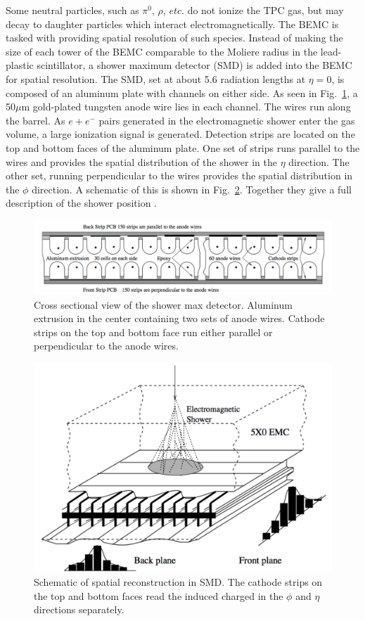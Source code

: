 \documentclass[letterpaper, abstract = on,listof=totoc, bibliography=totoc]{scrreprt}
\begin{document}
Some neutral particles, such as $\pi^0$, $\rho$, $etc.$ do not ionize the TPC gas, but may decay to daughter particles which interact electromagnetically. The BEMC is tasked with providing spatial resolution of such species. Instead of making the size of each tower of the BEMC comparable to the Moliere radius in the lead-plastic scintillator, a shower maximum detector (SMD) is added into the BEMC for spatial resolution. The SMD, set at about 5.6 radiation lengths at $\eta=0$, is composed of an aluminum plate with channels on either side. As seen in Fig.~\ref{fig:SMD2}, a 50$\mu$m gold-plated tungsten anode wire lies in each channel. The wires run along the barrel. As $e+e^-$ pairs generated in the electromagnetic shower enter the gas volume, a large ionization signal is generated. Detection strips are located on the top and bottom faces of the aluminum plate. One set of strips runs parallel to the wires and provides the spatial distribution of the shower in the $\eta$ direction. The other set, running perpendicular to the wires provides the spatial distribution in the $\phi$ direction. A schematic of this is shown in Fig.~\ref{fig:SMD1}. Together they give a full description of the shower position \cite{BEMC}.

\begin{figure}
\begin{center}
\includegraphics[width = .6\textwidth]{SMD2}
\caption[Shower Maximum Detector cross sectional view]{Cross sectional view of the shower max detector. Aluminum extrusion in the center containing two sets of anode wires. Cathode strips on the top and bottom face run either parallel or perpendicular to the anode wires.}
\label{fig:SMD2}
\end{center}
\end{figure}

\begin{figure}
\begin{center}
\includegraphics[width = .6\textwidth]{SMD1}
\caption[Spatial reconstruction in the SMD]{Schematic of spatial reconstruction in SMD. The cathode strips on the top and bottom faces read the induced charged in the $\phi$ and $\eta$ directions separately.}
\label{fig:SMD1}
\end{center}
\end{figure}
\end{document}
